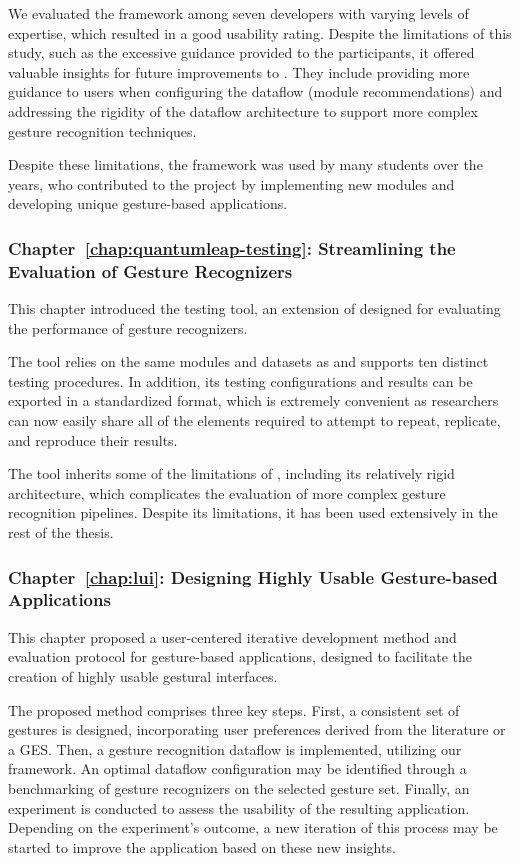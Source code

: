 We evaluated the framework among seven developers with varying levels of expertise, which resulted in a good usability rating. Despite the limitations of this study, such as the excessive guidance provided to the participants, it offered valuable insights for future improvements to \ql. 
%
They include providing more guidance to users when configuring the dataflow (\eg module recommendations) and addressing the rigidity of the \ql dataflow architecture to support more complex gesture recognition techniques.

Despite these limitations, the \ql framework was used by many students over the years, who contributed to the project by implementing new modules and developing unique gesture-based applications.

\subsubsection{Chapter~\ref{chap:quantumleap-testing}: Streamlining the Evaluation of Gesture Recognizers}
This chapter introduced the \ql testing tool, an extension of \ql designed for evaluating the performance of gesture recognizers. 

The tool relies on the same modules and datasets as \ql and supports ten distinct testing procedures. In addition, its testing configurations and results can be exported in a standardized format, which is extremely convenient as researchers can now easily share all of the elements required to attempt to repeat, replicate, and reproduce their results.

The tool inherits some of the limitations of \ql, including its relatively rigid architecture, which complicates the evaluation of more complex gesture recognition pipelines.
Despite its limitations, it has been used extensively in the rest of the thesis.

\subsubsection{Chapter~\ref{chap:lui}: Designing Highly Usable Gesture-based Applications}
This chapter proposed a user-centered iterative development method and evaluation protocol for gesture-based applications, designed to facilitate the creation of highly usable gestural interfaces. 

The proposed method comprises three key steps. 
%
First, a consistent set of gestures is designed, incorporating user preferences derived from the literature or a GES.
%
Then, a gesture recognition dataflow is implemented, \eg utilizing our \ql framework. An optimal dataflow configuration may be identified through a benchmarking of gesture recognizers on the selected gesture set.
%
Finally, an experiment is conducted to assess the usability of the resulting application. Depending on the experiment's outcome, a new iteration of this process may be started to improve the application based on these new insights.

